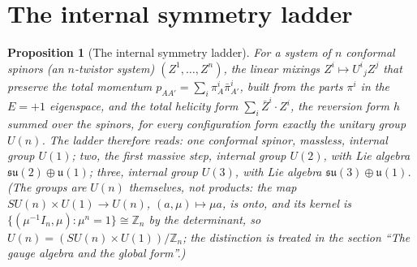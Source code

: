 \documentclass[11pt]{article}
\newtheorem{proposition}[theorem]{Proposition}
\theoremstyle{definition}
\theoremstyle{plain}
\newcommand{\changedmark}[2]{\marginpar{\raggedright\scriptsize\color{#1}#2}}
\providecommand{\su}{}\renewcommand{\su}{\mathfrak{su}}
\providecommand{\uu}{}\renewcommand{\uu}{\mathfrak{u}}
\begin{document}
\section{The internal symmetry ladder}

\begin{proposition}[The internal symmetry ladder]\label{c:standard-model.internal-symmetry-ladder}
\changedmark{gray}{reworded}
For a system of $n$ conformal spinors (an $n$-twistor system) $(Z^{1}, \ldots, Z^{n})$, the linear mixings $Z^{i} \mapsto U^{i}{}_{j} Z^{j}$ that preserve the total momentum $p_{AA'} = \sum_{i} \pi^{i}_{A}\bar\pi^{i}_{A'}$, built from the parts $\pi^{i}$ in the $E = +1$ eigenspace, and the total helicity form $\sum_{i} \bar{Z}^{i} \cdot Z^{i}$, the reversion form $h$ summed over the spinors, for every configuration form exactly the unitary group $U(n)$. The ladder therefore reads: one conformal spinor, massless, internal group $U(1)$; two, the first massive step, internal group $U(2)$, with Lie algebra $\su(2) \oplus \uu(1)$; three, internal group $U(3)$, with Lie algebra $\su(3) \oplus \uu(1)$. (The groups are $U(n)$ themselves, not products: the map $SU(n) \times U(1) \to U(n)$, $(a, \mu) \mapsto \mu a$, is onto, and its kernel is $\{(\mu^{-1}I_{n}, \mu) : \mu^{n} = 1\} \cong \mathbb{Z}_{n}$ by the determinant, so $U(n) = (SU(n) \times U(1))/\mathbb{Z}_{n}$; the distinction is treated in the section ``The gauge algebra and the global form''.)
\end{proposition}
\end{document}
